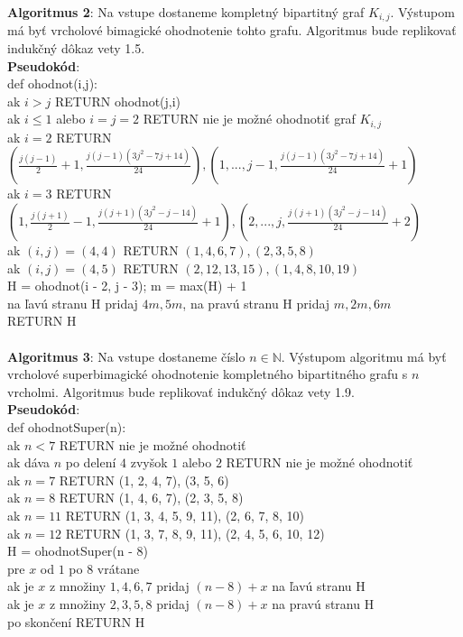 \documentclass[12pt]{article}
\begin{document}
\textbf{Algoritmus 2}: Na vstupe dostaneme kompletný bipartitný graf $K_{i,j}$. Výstupom má byť vrcholové bimagické ohodnotenie tohto grafu. Algoritmus bude replikovať indukčný dôkaz vety 1.5. \\

\textbf{Pseudokód}: \\
def ohodnot(i,j): \\
ak $i > j$ RETURN ohodnot(j,i) \\
ak $i \leq 1$ alebo $i = j = 2$ RETURN nie je možné ohodnotiť graf $K_{i,j}$ \\
ak $i = 2$ RETURN $(\frac{j(j-1)}{2} + 1, \frac{j(j-1)(3j^2-7j+14)}{24}), (1, ... , j-1, \frac{j(j-1)(3j^2-7j+14)}{24} + 1)$ \\
ak $i = 3$ RETURN $(1, \frac{j(j+1)}{2} - 1, \frac{j(j+1)(3j^2-j-14)}{24} + 1), (2, ... , j, \frac{j(j+1)(3j^2-j-14)}{24} + 2)$ \\
ak $(i, j) = (4,4)$ RETURN $(1, 4, 6, 7), (2, 3, 5, 8)$ \\
ak $(i, j) = (4,5)$ RETURN $(2, 12, 13, 15), (1, 4, 8, 10, 19)$ \\
H = ohodnot(i - 2, j - 3); m = max(H) + 1 \\
na ľavú stranu H pridaj $4m, 5m$, na pravú stranu H pridaj $m, 2m, 6m$ \\
RETURN H \\\\

\textbf{Algoritmus 3}: Na vstupe dostaneme číslo $n \in \mathbb{N}$. Výstupom algoritmu má byť vrcholové superbimagické ohodnotenie kompletného bipartitného grafu s $n$ vrcholmi. Algoritmus bude replikovať indukčný dôkaz vety 1.9. \\

\textbf{Pseudokód}: \\
def ohodnotSuper(n): \\
ak $n < 7$ RETURN nie je možné ohodnotiť \\
ak dáva $n$ po delení $4$ zvyšok $1$ alebo $2$ RETURN nie je možné ohodnotiť \\
ak $n = 7$ RETURN (1, 2, 4, 7), (3, 5, 6) \\
ak $n = 8$ RETURN (1, 4, 6, 7), (2, 3, 5, 8) \\
ak $n = 11$ RETURN (1, 3, 4, 5, 9, 11), (2, 6, 7, 8, 10) \\
ak $n = 12$ RETURN (1, 3, 7, 8, 9, 11), (2, 4, 5, 6, 10, 12) \\
H = ohodnotSuper(n - 8) \\
pre $x$ od $1$ po $8$ vrátane \\
ak je $x$ z množiny $1, 4, 6, 7$ pridaj $(n-8)+x$ na ľavú stranu H \\
ak je $x$ z množiny $2, 3, 5, 8$ pridaj $(n-8)+x$ na pravú stranu H \\
po skončení RETURN H \\\\
\end{document}
